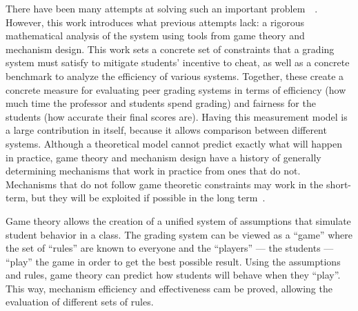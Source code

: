 \documentclass[12pt, Arial]{article}
\begin{document}
There have been many attempts at solving such an important problem~\cite{autograding}~\cite{edxsoftware}. However, this work introduces what previous attempts lack: a rigorous mathematical analysis of the system using tools from game theory and mechanism design. This work sets a concrete set of constraints that a grading system must satisfy to mitigate students' incentive to cheat, as well as a concrete benchmark to analyze the efficiency of various systems. Together, these create a concrete measure for evaluating peer grading systems in terms of efficiency (how much time the professor and students spend grading) and fairness for the students (how accurate their final scores are). Having this measurement model is a large contribution in itself, because it allows comparison between different systems. Although a theoretical model cannot predict exactly what will happen in practice, game theory and mechanism design have a history of generally determining mechanisms that work in practice from ones that do not. Mechanisms that do not follow game theoretic constraints may work in the short-term, but they will be exploited if possible in the long term~\cite{boycottfinal}.

Game theory allows the creation of a unified system of assumptions that simulate student behavior in a class. The grading system can be viewed as a ``game'' where the set of ``rules'' are known to everyone and the ``players'' --- the students --- ``play'' the game in order to get the best possible result. Using the assumptions and rules, game theory can predict how students will behave when they ``play''. This way, mechanism efficiency and effectiveness cam be proved, allowing the evaluation of different sets of rules.
\end{document}

